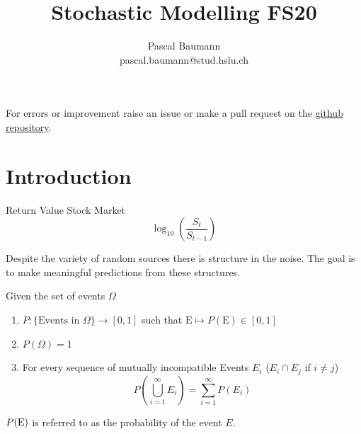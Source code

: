 \documentclass[11pt]{article}
\theoremstyle{definition}
\begin{document}
	
\title{Stochastic Modelling FS20}
\author{Pascal Baumann\\pascal.baumann@stud.hslu.ch}
\maketitle



For errors or improvement raise an issue or make a pull request on the \href{https://github.com/KilnOfTheSecondFlame/mse_summaries}{github repository}.

\tableofcontents
\newpage



\section{Introduction}

Return Value Stock Market
\begin{equation*}
	\log_{10}\left(\frac{S_t}{S_{t-1}}\right)
\end{equation*}

Despite the variety of random sources there is structure in the noise. The goal is to make meaningful predictions from these structures.

\begin{definition}
	Given the set of events $\Omega$
	\begin{enumerate}[label=\Roman*.]
		\item $P: \{\text{Events in }\Omega\}\rightarrow [0,1]$ such that $\text{E} \mapsto P(\text{E})\in[0,1]$
		\item $P(\Omega) = 1$
		\item For every sequence of mutually incompatible Events $E_i$ ($E_i\cap E_j$ if $i\neq j$)
		\begin{equation*}
			P\left(\bigcup_{i=1}^\infty E_i\right) = \sum_{i=1}^{\infty} P(E_i)
		\end{equation*}
	\end{enumerate}
	$P(\text E)$ is referred to as the probability of the event $E$.
\end{definition}
\end{document}
